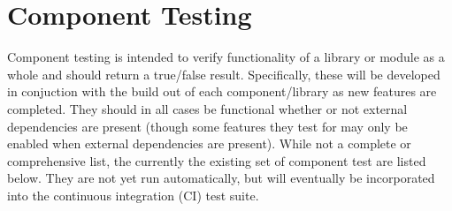 %
%
\section{Component Testing}
\label{sec:component}

Component testing is intended to verify functionality of a library or module as a whole and should return a true/false result. Specifically, these will
be developed in conjuction with the build out of each component/library as new features are completed. They should in all
cases be functional whether or not external dependencies are present (though some features they test for may only be enabled
when external dependencies are present). While not a complete or comprehensive list, the currently the existing set of component test are listed below. 
They are not yet run automatically, but will eventually be incorporated into the continuous integration (CI) test suite.

